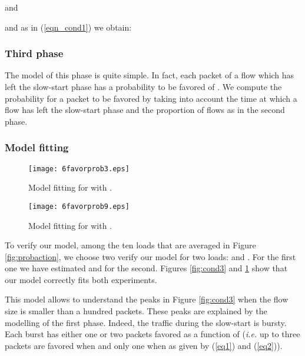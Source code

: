\documentclass{elsart}
\begin{document}
\small

and

\normalsize

and as in (\ref{eqn_cond1}) we obtain:

\small

\normalsize

\subsubsection*{Third phase}

The model of this phase is quite simple. In fact, each packet of a flow which has left the slow-start phase has a probability to be favored of . We compute the probability for a packet to be favored by taking into account the time at which a flow has left the slow-start phase and the proportion of flows as in the second phase.

\subsubsection*{Model fitting}

\begin{figure}[htb!]
   \begin{minipage}[b]{1.0\columnwidth}
	\centering
	\texttt{[image: 6favorprob3.eps]}
	\caption{Model fitting for  with .}
	\label{fig:cond3}
   \end{minipage}
   
   \begin{minipage}[b]{1.0\columnwidth}   
	\centering
	\texttt{[image: 6favorprob9.eps]}
	\caption{Model fitting for  with .}
	\label{fig:cond9}
   \end{minipage}
\end{figure}

To verify our model, among the ten loads that are averaged in Figure \ref{fig:probaction}, we choose two verify our model for two loads:  and .
For the first one we have estimated  and  for the second. Figures \ref{fig:cond3} and \ref{fig:cond9} show that our model correctly fits both experiments.

This model allows to understand the peaks in Figure \ref{fig:cond3} when the flow size is smaller than a hundred packets. These peaks are explained by the modelling of the first phase. Indeed, the traffic during the slow-start is bursty. Each burst has either one or two packets favored as a function of  (\textit{i.e.} up to three packets are favored when  and only one when  as given by (\ref{eq1}) and (\ref{eq2})).
\end{document}
